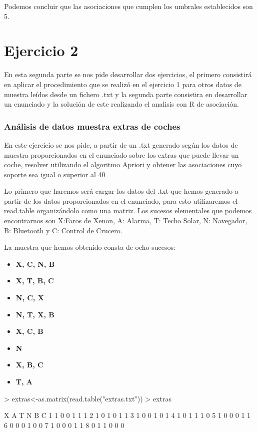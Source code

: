 \documentclass [a4paper] {article}
\begin{document}
Podemos concluir que las asociaciones que cumplen los umbrales establecidos son 5.

\section{Ejercicio 2} En esta segunda parte se nos pide desarrollar dos ejercicios, el primero consistirá en aplicar el procedimiento
que se realizó en el ejercicio 1 para otros datos de muestra leídos desde un fichero .txt y la segunda parte consistira en desarrollar un
enunciado y la solución de este realizando el analisis con R de asociación.

\subsubsection{Análisis de datos muestra extras de coches} 
En este ejercicio se nos pide, a partir de un .txt generado según los datos de muestra proporcionados
en el enunciado sobre los extras que puede llevar un coche, resolver utilizando el algoritmo Apriori y obtener las asociaciones
cuyo soporte sea igual o superior al 40%

Lo primero que haremos será cargar los datos del .txt que hemos generado a partir de los datos proporcionados en el enunciado, para esto
utilizaremos el read.table organizándolo como una matriz. Los sucesos elementales que podemos
encontrarnos son {X:Faros de Xenon}, {A: Alarma}, {T: Techo Solar}, {N: Navegador}, {B: Bluetooth} y {C: Control de Crucero}.

La muestra que hemos obtenido consta de ocho sucesos:
\begin{itemize}
	\item \textbf{{X, C, N, B}}
	\item \textbf{{X, T, B, C}}
	\item \textbf{{N, C, X}}
        \item \textbf{{N, T, X, B}}
        \item \textbf{{X, C, B}}
        \item \textbf{{N}}		
		\item \textbf{{X, B, C}}	
		\item \textbf{{T, A}}									 
\end{itemize}

\begin{Schunk}
\begin{Sinput}
> extras<-as.matrix(read.table("extras.txt"))
> extras
\end{Sinput}
\begin{Soutput}
  X A T N B C
1 1 0 0 1 1 1
2 1 0 1 0 1 1
3 1 0 0 1 0 1
4 1 0 1 1 1 0
5 1 0 0 0 1 1
6 0 0 0 1 0 0
7 1 0 0 0 1 1
8 0 1 1 0 0 0
\end{Soutput}
\end{Schunk}
\end{document}

